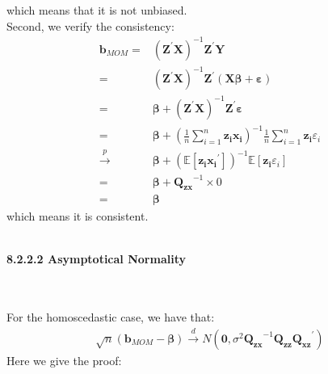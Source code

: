 \documentclass{article}
\begin{document}
which means that it is not unbiased.\\
Second, we verify the consistency:
	\begin{align*}
		\boldsymbol{b}_{MOM} = &(\boldsymbol{Z}^\prime \boldsymbol{X})^{-1} \boldsymbol{Z}^\prime \boldsymbol{Y}\\ = &
		(\boldsymbol{Z}^\prime \boldsymbol{X})^{-1} \boldsymbol{Z}^\prime (\boldsymbol{X}\boldsymbol{\beta} + \boldsymbol{\varepsilon})\\ = &
		\boldsymbol{\beta} + (\boldsymbol{Z}^\prime \boldsymbol{X})^{-1} \boldsymbol{Z}^\prime \boldsymbol{\varepsilon}\\ = &
		\boldsymbol{\beta} + \left( \frac{1}{n} \sum^n_{i=1} \boldsymbol{z_i} \boldsymbol{x_i} \right)^{-1} \frac{1}{n} \sum^n_{i=1} \boldsymbol{z_i}\varepsilon_i\\ \xrightarrow{p} &
		\boldsymbol{\beta} + (\mathbb{E}[\boldsymbol{z_i} \boldsymbol{x_i}^\prime])^{-1} \mathbb{E}[\boldsymbol{z_i} \varepsilon_i]\\ = &
		\boldsymbol{\beta} + \boldsymbol{Q_{zx}}^{-1} \times 0\\ = &
		\boldsymbol{\beta} 
	\end{align*}
which means it is consistent.\\\\
\centerline{\textbf{8.2.2.2 Asymptotical Normality}}\\\\
For the homoscedastic case, we have that:
	\begin{align*}
		\sqrt{n}(\boldsymbol{b}_{MOM} - \boldsymbol{\beta}) \xrightarrow{d} N(\boldsymbol{0}, \sigma^2 \boldsymbol{Q_{zx}}^{-1} \boldsymbol{Q_{zz}} \boldsymbol{Q_{xz}}^\prime)
	\end{align*}
Here we give the proof:
\end{document}

